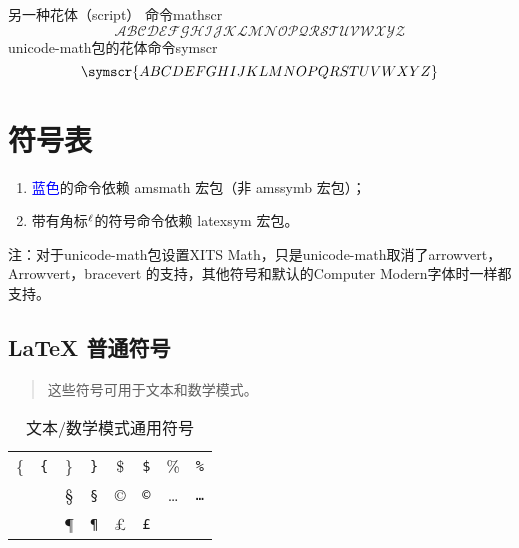 \documentclass{article}
\makeatletter
\def\lsym{$\mathsurround=0pt {}^\ell$}
\def\SC      #1{#1       & \texttt{\string#1}}
\newenvironment{symbols}[1]%
  {\small\def\arraystretch{1.5
  }
  \begin{tabular}{@{}#1@{}}}%
  {\end{tabular}}
\makeatother
\begin{document}
另一种花体（script） 命令mathscr
\begin{equation}
  \mathscr{ABCDEFGHIJKLMNOPQRSTUVWXYZ}
\end{equation}
unicode-math包的花体命令symscr
\begin{equation}
  \symscr{ABCDEFGHIJKLMNOPQRSTUVWXYZ}
\end{equation}
  

\clearpage
\section{符号表}\label{sec:math-tables}
  \begin{enumerate}
    \item \textcolor{blue}{蓝色}的命令依赖 {amsmath} 宏包（非 {amssymb} 宏包）；
    \item 带有角标\lsym 的符号命令依赖 {latexsym} 宏包。
  \end{enumerate}
注：对于unicode-math包设置XITS Math，只是unicode-math取消了{arrowvert}，{Arrowvert}，{bracevert} 的支持，其他符号和默认的Computer Modern字体时一样都支持。
\subsection{\LaTeX{} 普通符号}
\begin{table}[htp]
\centering
\caption{文本/数学模式通用符号}\label{tbl:general-syms}
\begin{quote}\footnotesize%
这些符号可用于文本和数学模式。
\end{quote}
\begin{symbols}{*4{cl}}
\hline
 \SC{\{}    &  \SC{\}}  &  \SC{\$}         &  \SC{\%}               \\
 \SC{\dag}  &  \SC{\S}  &  \SC{\copyright} &  \SC{\dots}            \\
 \SC{\ddag} &  \SC{\P}  &  \SC{\pounds}    &                        \\
\hline
\end{symbols}
\end{table}
\end{document}
